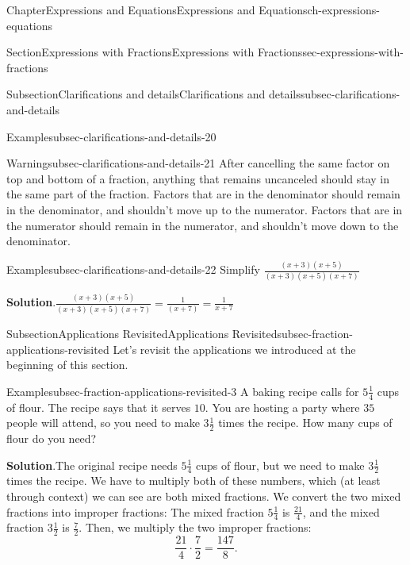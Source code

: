 \documentclass[twoside,11pt,]{book}
\newcommand{\blocktitlefont}{\relax}
\numberwithin{equation}{chapter}
\begin{document}
\begin{chapterptx}{Chapter}{Expressions and Equations}{}{Expressions and Equations}{}{}{ch-expressions-equations}
\begin{sectionptx}{Section}{Expressions with Fractions}{}{Expressions with Fractions}{}{}{sec-expressions-with-fractions}
\begin{subsectionptx}{Subsection}{Clarifications and details}{}{Clarifications and details}{}{}{subsec-clarifications-and-details}
\begin{example}{Example}{}{subsec-clarifications-and-details-20}
\end{example}
\begin{warning}{Warning}{}{subsec-clarifications-and-details-21}%
After cancelling the same factor on top and bottom of a fraction, anything that remains uncanceled should stay in the same part of the fraction. Factors that are in the denominator should remain in the denominator, and shouldn't move up to the numerator. Factors that are in the numerator should remain in the numerator, and shouldn't move down to the denominator.%
\end{warning}
\begin{example}{Example}{}{subsec-clarifications-and-details-22}%
Simplify \(\frac{(x+3)(x+5)}{(x+3)(x+5)(x+7)}\)%
\par\smallskip%
\noindent\textbf{\blocktitlefont Solution}.\hypertarget{subsec-clarifications-and-details-22-2}{}\quad{}\(\frac{(x+3)(x+5)}{(x+3)(x+5)(x+7)} = \frac{1}{(x+7)} = \frac1{x+7}\)%
\end{example}
\end{subsectionptx}
%
%
\typeout{************************************************}
\typeout{************************************************}
%
\begin{subsectionptx}{Subsection}{Applications Revisited}{}{Applications Revisited}{}{}{subsec-fraction-applications-revisited}
Let's revisit the applications we introduced at the beginning of this section.%
\begin{example}{Example}{}{subsec-fraction-applications-revisited-3}%
A baking recipe calls for \(5\frac{1}{4}\) cups of flour. The recipe says that it serves \(10\). You are hosting a party where \(35\) people will attend, so you need to make \(3\frac{1}{2}\) times the recipe. How many cups of flour do you need?%
\par\smallskip%
\noindent\textbf{\blocktitlefont Solution}.\hypertarget{subsec-fraction-applications-revisited-3-2}{}\quad{}The original recipe needs \(5\frac{1}{4}\) cups of flour, but we need to make \(3\frac{1}{2}\) times the recipe. We have to multiply both of these numbers, which (at least through context) we can see are both mixed fractions. We convert the two mixed fractions into improper fractions: The mixed fraction \(5\frac{1}{4}\) is \(\frac{21}{4}\), and the mixed fraction \(3\frac{1}{2}\) is \(\frac{7}{2}\). Then, we multiply the two improper fractions:%
\begin{equation*}
\frac{21}{4} \cdot \frac{7}{2} = \frac{147}{8}.
\end{equation*}

\end{example}
\end{subsectionptx}
\end{sectionptx}
\end{chapterptx}
\end{document}
